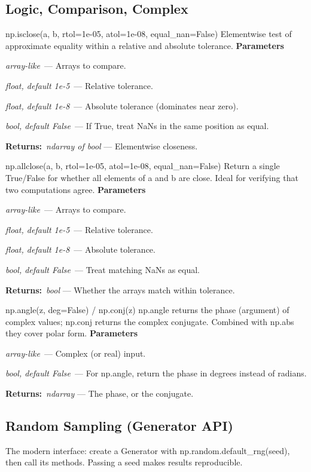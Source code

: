 \documentclass[10pt]{article}
\newenvironment{params}
  {\smallskip\textbf{\small\color{accent}Parameters}\par\nopagebreak
   \begin{description}[leftmargin=1.3em,itemsep=1.5pt,parsep=0pt,topsep=1pt,
      labelindent=0pt,style=sameline,font=\normalfont]}
  {\end{description}}
\newcommand{\pitem}[3]{\item[{\ttfamily\color{accent}#1}]{\itshape #2}\ --- #3}
\newcommand{\preturn}[2]{\smallskip\textbf{\small\color{accent}Returns:}\ {\itshape #1} --- #2\par}
\begin{document}
\subsection{Logic, Comparison, Complex}
\begin{func}{np.isclose(a, b, rtol=1e-05, atol=1e-08, equal\_nan=False)}
Elementwise test of approximate equality within a relative and absolute tolerance.
\begin{params}
\pitem{a, b}{array-like}{Arrays to compare.}
\pitem{rtol}{float, default 1e-5}{Relative tolerance.}
\pitem{atol}{float, default 1e-8}{Absolute tolerance (dominates near zero).}
\pitem{equal\_nan}{bool, default False}{If True, treat NaNs in the same position as equal.}
\end{params}
\preturn{ndarray of bool}{Elementwise closeness.}
\end{func}
\medskip

\begin{func}{np.allclose(a, b, rtol=1e-05, atol=1e-08, equal\_nan=False)}
Return a single True/False for whether all elements of a and b are close. Ideal for verifying that two computations agree.
\begin{params}
\pitem{a, b}{array-like}{Arrays to compare.}
\pitem{rtol}{float, default 1e-5}{Relative tolerance.}
\pitem{atol}{float, default 1e-8}{Absolute tolerance.}
\pitem{equal\_nan}{bool, default False}{Treat matching NaNs as equal.}
\end{params}
\preturn{bool}{Whether the arrays match within tolerance.}
\end{func}
\medskip

\begin{func}{np.angle(z, deg=False)  /  np.conj(z)}
np.angle returns the phase (argument) of complex values; np.conj returns the complex conjugate. Combined with np.abs they cover polar form.
\begin{params}
\pitem{z}{array-like}{Complex (or real) input.}
\pitem{deg}{bool, default False}{For np.angle, return the phase in degrees instead of radians.}
\end{params}
\preturn{ndarray}{The phase, or the conjugate.}
\end{func}
\medskip

\subsection{Random Sampling (Generator API)}
The modern interface: create a Generator with np.random.default\_rng(seed), then call its methods. Passing a seed makes results reproducible.
\end{document}
